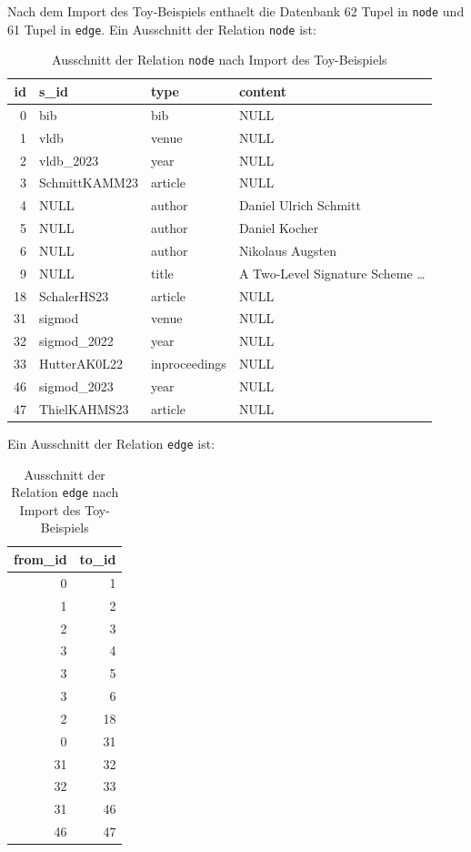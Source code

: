 \documentclass[11pt]{scrartcl}
\begin{document}
Nach dem Import des Toy-Beispiels enthaelt die Datenbank 62 Tupel in \texttt{node} und 61 Tupel in \texttt{edge}. Ein Ausschnitt der Relation \texttt{node} ist:

\begin{table}[H]
  \centering
  \begin{tabular}{rlll}
    \toprule
    id & s\_id & type & content \\
    \midrule
    0 & bib & bib & NULL \\
    1 & vldb & venue & NULL \\
    2 & vldb\_2023 & year & NULL \\
    3 & SchmittKAMM23 & article & NULL \\
    4 & NULL & author & Daniel Ulrich Schmitt \\
    5 & NULL & author & Daniel Kocher \\
    6 & NULL & author & Nikolaus Augsten \\
    9 & NULL & title & A Two-Level Signature Scheme \ldots \\
    18 & SchalerHS23 & article & NULL \\
    31 & sigmod & venue & NULL \\
    32 & sigmod\_2022 & year & NULL \\
    33 & HutterAK0L22 & inproceedings & NULL \\
    46 & sigmod\_2023 & year & NULL \\
    47 & ThielKAHMS23 & article & NULL \\
    \bottomrule
  \end{tabular}
  \caption{Ausschnitt der Relation \texttt{node} nach Import des Toy-Beispiels}
\end{table}

Ein Ausschnitt der Relation \texttt{edge} ist:

\begin{table}[H]
  \centering
  \begin{tabular}{rr}
    \toprule
    from\_id & to\_id \\
    \midrule
    0 & 1 \\
    1 & 2 \\
    2 & 3 \\
    3 & 4 \\
    3 & 5 \\
    3 & 6 \\
    2 & 18 \\
    0 & 31 \\
    31 & 32 \\
    32 & 33 \\
    31 & 46 \\
    46 & 47 \\
    \bottomrule
  \end{tabular}
  \caption{Ausschnitt der Relation \texttt{edge} nach Import des Toy-Beispiels}
\end{table}
\end{document}
